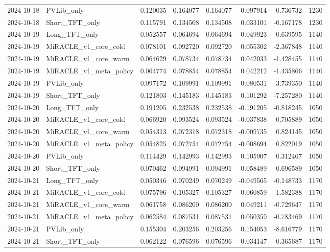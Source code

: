 \begin{tabular}{llrrrrrr}
2024-10-18 & PVLib_only & 0.120035 & 0.164077 & 0.164077 & 0.097914 & -0.736732 & 1230 \\
2024-10-18 & Short_TFT_only & 0.115791 & 0.134508 & 0.134508 & 0.033101 & -0.167178 & 1230 \\
2024-10-19 & Long_TFT_only & 0.052557 & 0.064694 & 0.064694 & -0.049923 & -0.639595 & 1140 \\
2024-10-19 & MiRACLE_v1_core_cold & 0.078101 & 0.092720 & 0.092720 & 0.055302 & -2.367848 & 1140 \\
2024-10-19 & MiRACLE_v1_core_warm & 0.064629 & 0.078734 & 0.078734 & 0.042033 & -1.428455 & 1140 \\
2024-10-19 & MiRACLE_v1_meta_policy & 0.064774 & 0.078854 & 0.078854 & 0.042212 & -1.435866 & 1140 \\
2024-10-19 & PVLib_only & 0.097172 & 0.109991 & 0.109991 & 0.080531 & -3.739350 & 1140 \\
2024-10-19 & Short_TFT_only & 0.121803 & 0.145183 & 0.145183 & 0.101292 & -7.257280 & 1140 \\
2024-10-20 & Long_TFT_only & 0.191205 & 0.232538 & 0.232538 & -0.191205 & -0.818245 & 1050 \\
2024-10-20 & MiRACLE_v1_core_cold & 0.066920 & 0.093524 & 0.093524 & -0.037838 & 0.705889 & 1050 \\
2024-10-20 & MiRACLE_v1_core_warm & 0.054313 & 0.072318 & 0.072318 & -0.009735 & 0.824145 & 1050 \\
2024-10-20 & MiRACLE_v1_meta_policy & 0.054825 & 0.072754 & 0.072754 & -0.008694 & 0.822019 & 1050 \\
2024-10-20 & PVLib_only & 0.114429 & 0.142993 & 0.142993 & 0.105907 & 0.312467 & 1050 \\
2024-10-20 & Short_TFT_only & 0.070462 & 0.094991 & 0.094991 & 0.058489 & 0.696589 & 1050 \\
2024-10-21 & Long_TFT_only & 0.050346 & 0.070249 & 0.070249 & -0.049565 & -0.148733 & 1170 \\
2024-10-21 & MiRACLE_v1_core_cold & 0.075796 & 0.105327 & 0.105327 & 0.060859 & -1.582388 & 1170 \\
2024-10-21 & MiRACLE_v1_core_warm & 0.061758 & 0.086200 & 0.086200 & 0.049211 & -0.729647 & 1170 \\
2024-10-21 & MiRACLE_v1_meta_policy & 0.062584 & 0.087531 & 0.087531 & 0.050359 & -0.783469 & 1170 \\
2024-10-21 & PVLib_only & 0.155304 & 0.203256 & 0.203256 & 0.154053 & -8.616779 & 1170 \\
2024-10-21 & Short_TFT_only & 0.062122 & 0.076596 & 0.076596 & 0.034147 & -0.365687 & 1170 \\

\end{tabular}
